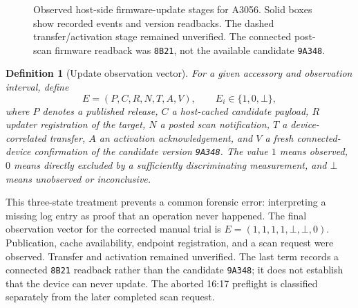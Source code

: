 \documentclass[11pt,letterpaper]{article}
\newtheorem{definition}{Definition}
\begin{document}
\begin{figure}[htbp]\centering
{}
\caption{Observed host-side firmware-update stages for A3056. Solid boxes show recorded events and version readbacks. The dashed transfer/activation stage remained unverified. The connected post-scan firmware readback was \texttt{8B21}, not the available candidate \texttt{9A348}.}\label{fig:pipeline}
\end{figure}

\begin{definition}[Update observation vector]
For a given accessory and observation interval, define
\[
E=(P,C,R,N,T,A,V),\qquad E_i\in\{1,0,\bot\},
\]
where $P$ denotes a published release, $C$ a host-cached candidate payload, $R$ updater registration of the target, $N$ a posted scan notification, $T$ a device-correlated transfer, $A$ an activation acknowledgement, and $V$ a fresh connected-device confirmation of the candidate version \texttt{9A348}. The value $1$ means observed, $0$ means directly excluded by a sufficiently discriminating measurement, and $\bot$ means unobserved or inconclusive.
\end{definition}

This three-state treatment prevents a common forensic error: interpreting a missing log entry as proof that an operation never happened. The final observation vector for the corrected manual trial is $E=(1,1,1,1,\bot,\bot,0)$. Publication, cache availability, endpoint registration, and a scan request were observed. Transfer and activation remained unverified. The last term records a connected \texttt{8B21} readback rather than the candidate \texttt{9A348}; it does not establish that the device can never update. The aborted 16:17 preflight is classified separately from the later completed scan request.
\end{document}
